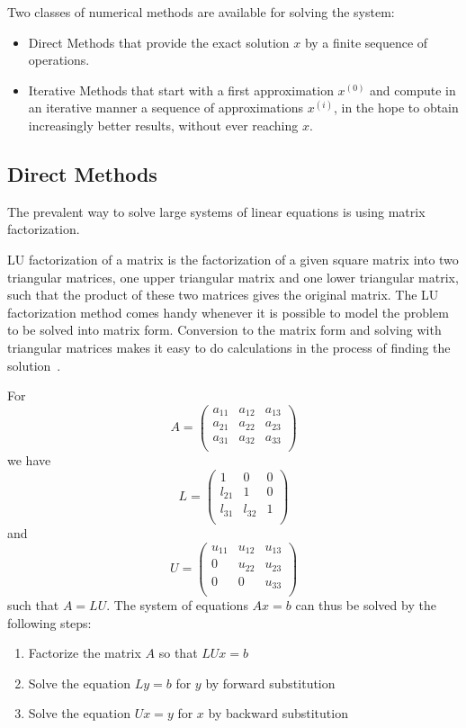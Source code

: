 Two classes of numerical methods are available for solving the system:
\begin{itemize}
    \item Direct Methods that provide the exact solution $x$ by a finite 
        sequence of operations.
    \item Iterative Methods that start with a first approximation $x^{(0)}$ and 
        compute in an iterative manner a sequence of approximations $x^{(i)}$, 
        in the hope to obtain increasingly better results, without ever reaching 
        $x$.
\end{itemize}

\subsection{Direct Methods}
The prevalent way to solve large systems of linear equations is using matrix 
factorization.

LU factorization of a matrix is the factorization of a given square matrix into 
two triangular matrices, one upper triangular matrix and one lower triangular 
matrix, such that the product of these two matrices gives the original matrix.  
The LU factorization method comes handy whenever it is possible to model the 
problem to be solved into matrix form. Conversion to the matrix form and solving 
with triangular matrices makes it easy to do calculations in the process of 
finding the solution~\cite{mc, nla}.

For $$ A=
\begin{pmatrix}
    a_{11}&a_{12}&a_{13}\\
    a_{21}&a_{22}&a_{23}\\
    a_{31}&a_{32}&a_{33}\\
\end{pmatrix} $$ we have
$$ L=
\begin{pmatrix}
    1      &  0       &  0  \\
    l_{21} &  1       &  0  \\
    l_{31} &  l_{32}  &  1  \\
\end{pmatrix} $$ and $$ U=
\begin{pmatrix}
    u_{11} &  u_{12}  &  u_{13}  \\
    0 &  u_{22}  &  u_{23}  \\
    0 &  0  &  u_{33}  \\
\end{pmatrix} $$ such that $A = LU$. The system of equations $Ax = b$ can thus 
be solved by the following steps:
\begin{enumerate}
    \item Factorize the matrix $A$ so that $LUx = b$
    \item Solve the equation $Ly = b$ for $y$ by forward substitution
    \item Solve the equation $Ux = y$ for $x$ by backward substitution
\end{enumerate}

